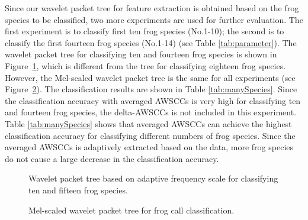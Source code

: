 Since our wavelet packet tree for feature extraction is obtained based on the frog species to be classified, two more experiments are used for further evaluation. The first experiment is to classify first ten frog species (No.1-10); the second is to classify the first fourteen frog species (No.1-14) (see Table \ref{tab:parameter}). The wavelet packet tree for classifying ten and fourteen frog species is shown in Figure~\ref{fig:wpTree}, which is different from the tree for classifying eighteen frog species. However, the Mel-scaled wavelet packet tree is the same for all experiments (see Figure~\ref{fig:melTree}). The classification results are shown in Table \ref{tab:manySpecies}. Since the classification accuracy with averaged AWSCCs is very high for classifying ten and fourteen frog species, the delta-AWSCCs is not included in this experiment. Table \ref{tab:manySpecies} shows that averaged AWSCCs can achieve the highest classification accuracy for classifying different numbers of frog species. Since the averaged AWSCCs is adaptively extracted based on the data, more frog species do not cause a large decrease in the classification accuracy.  



\begin{figure}[htb!] %
\caption[WP tree for classifying different number of frog species]{Wavelet packet tree based on adaptive frequency scale for classifying ten and fifteen frog species.}
\label{fig:wpTree} 
\end{figure}


\begin{figure}[htb!] %
\caption{Mel-scaled wavelet packet tree for frog call classification.}
\label{fig:melTree} 
\end{figure}


